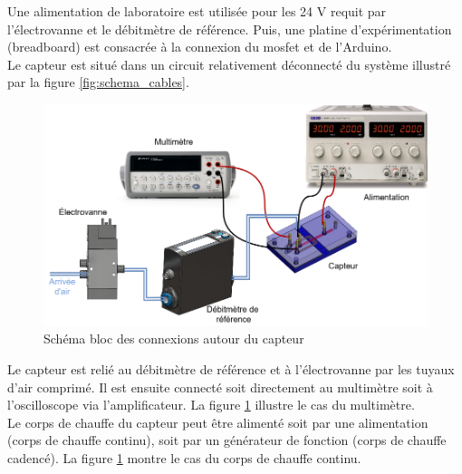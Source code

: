 Une alimentation de laboratoire est utilisée pour les 24 V requit par l'électrovanne et le débitmètre de référence. Puis, une platine d'expérimentation 
(breadboard) est consacrée à la connexion du \gls{mosfet} et de l'Arduino. \\

Le capteur est situé dans un circuit relativement déconnecté du système illustré par la figure \ref{fig:schema_cables}. 
\begin{figure}[H]
    \centering
    \includegraphics[scale=0.35]{assets/figures/Raccord_air.png}
    \caption{Schéma bloc des connexions autour du capteur}
    \label{fig:circuit_capteur}
\end{figure}
Le capteur est relié au débitmètre de référence et à l'électrovanne par les tuyaux d'air comprimé. Il est ensuite connecté soit directement au 
multimètre soit à l'oscilloscope via l'amplificateur. La figure \ref{fig:circuit_capteur} illustre le cas du multimètre. \\

Le corps de chauffe du capteur peut être alimenté soit par une alimentation (corps de chauffe continu), soit par un générateur de fonction (corps 
de chauffe cadencé). La figure \ref{fig:circuit_capteur} montre le cas du corps de chauffe continu. 

